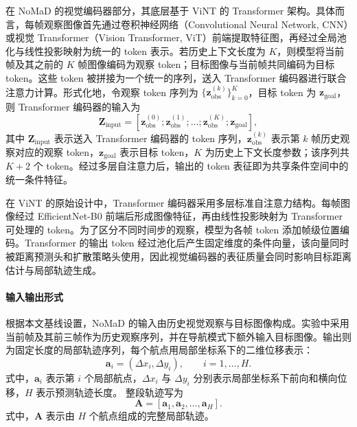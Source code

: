在 NoMaD 的视觉编码器部分，其底层基于 ViNT 的 Transformer 架构。具体而言，每帧观察图像首先通过卷积神经网络（Convolutional Neural Network, CNN）或视觉 Transformer（Vision Transformer, ViT）前端提取特征图，再经过全局池化与线性投影映射为统一的 token 表示。若历史上下文长度为 $K$，则模型将当前帧及其之前的 $K$ 帧图像编码为观察 token；目标图像与当前帧共同编码为目标 token。这些 token 被拼接为一个统一的序列，送入 Transformer 编码器进行联合注意力计算。形式化地，令观察 token 序列为 $\{\mathbf{z}_{\text{obs}}^{(k)}\}_{k=0}^{K}$，目标 token 为 $\mathbf{z}_{\text{goal}}$，则 Transformer 编码器的输入为
\begin{equation}
\mathbf{Z}_{\text{input}} = [\mathbf{z}_{\text{obs}}^{(0)}; \mathbf{z}_{\text{obs}}^{(1)}; \ldots; \mathbf{z}_{\text{obs}}^{(K)}; \mathbf{z}_{\text{goal}}],
\end{equation}
其中 $\mathbf{Z}_{\text{input}}$ 表示送入 Transformer 编码器的 token 序列，$\mathbf{z}_{\text{obs}}^{(k)}$ 表示第 $k$ 帧历史观察对应的观察 token，$\mathbf{z}_{\text{goal}}$ 表示目标 token，$K$ 为历史上下文长度参数；该序列共 $K+2$ 个 token。经过多层自注意力后，输出的 token 表征即为共享条件空间中的统一条件特征。

在 ViNT\cite{vint2023} 的原始设计中，Transformer\cite{transformer2017} 编码器采用多层标准自注意力结构。每帧图像经过 EfficientNet-B0\cite{efficientnet2019} 前端后形成图像特征，再由线性投影映射为 Transformer 可处理的 token。为了区分不同时间步的观察，模型为各帧 token 添加帧级位置编码。Transformer 的输出 token 经过池化后产生固定维度的条件向量，该向量同时被距离预测头和扩散策略头使用，因此视觉编码器的表征质量会同时影响目标距离估计与局部轨迹生成。

\paragraph*{输入输出形式}

根据本文基线设置，NoMaD 的输入由历史视觉观察与目标图像构成。实验中采用当前帧及其前三帧作为历史观察序列，并在导航模式下额外输入目标图像。输出则为固定长度的局部轨迹序列，每个航点用局部坐标系下的二维位移表示：
\begin{equation}
\mathbf{a}_i = (\Delta x_i, \Delta y_i), \qquad i=1,\ldots,H.
\end{equation}
式中，$\mathbf{a}_i$ 表示第 $i$ 个局部航点，$\Delta x_i$ 与 $\Delta y_i$ 分别表示局部坐标系下前向和横向位移，$H$ 表示预测轨迹长度。
整段轨迹写为
\begin{equation}
\mathbf{A} = [\mathbf{a}_1,\mathbf{a}_2,\ldots,\mathbf{a}_H].
\end{equation}
式中，$\mathbf{A}$ 表示由 $H$ 个航点组成的完整局部轨迹。

